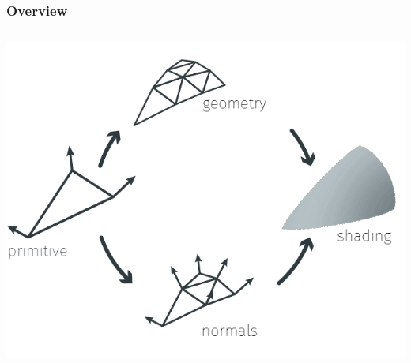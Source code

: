 	\begin{frame}\frametitle{Overview}
		\begin{columns}
			\begin{column}{0.9\textwidth}
				\begin{center}
					\includegraphics[width=\textwidth]{./img/1_single/recap_overview.png}
				\end{center}		
			\end{column}
		\end{columns}
	\end{frame}	
